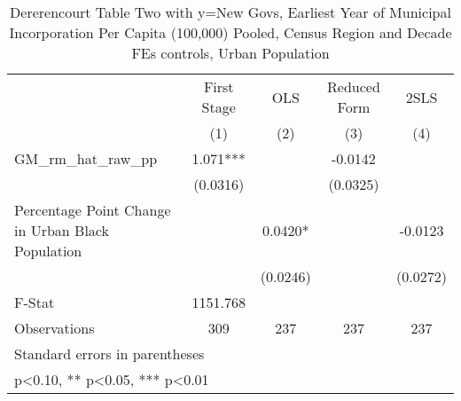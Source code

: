 \begin{table}[htbp]\centering
\def\sym#1{\ifmmode^{#1}\else\(^{#1}\)\fi}
\caption{Dererencourt Table Two with y=New Govs, Earliest Year of Municipal Incorporation Per Capita (100,000) Pooled, Census Region and Decade FEs controls, Urban Population}
\begin{tabular}{l*{4}{c}}
\toprule
                    & First Stage   &         OLS   &Reduced Form   &        2SLS   \\
                    &\multicolumn{1}{c}{(1)}   &\multicolumn{1}{c}{(2)}   &\multicolumn{1}{c}{(3)}   &\multicolumn{1}{c}{(4)}   \\
\midrule
GM\_rm\_hat\_raw\_pp    &       1.071***&               &     -0.0142   &               \\
                    &    (0.0316)   &               &    (0.0325)   &               \\
\addlinespace
Percentage Point Change in Urban Black Population&               &      0.0420*  &               &     -0.0123   \\
                    &               &    (0.0246)   &               &    (0.0272)   \\
\midrule
F-Stat              &    1151.768   &               &               &               \\
Observations        &         309   &         237   &         237   &         237   \\
\bottomrule
\multicolumn{5}{l}{\footnotesize Standard errors in parentheses}\\
\multicolumn{5}{l}{\footnotesize * p<0.10, ** p<0.05, *** p<0.01}\\
\end{tabular}
\end{table}
